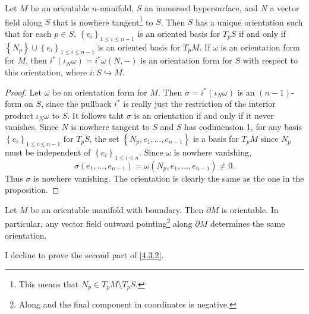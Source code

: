 \begin{proposition}\label{4.3.1}
	Let $M$ be an orientable $n$-manifold, $S$ an immersed hypersurface, and $N$ a vector field along $S$ that is nowhere tangent\footnote{This means that $N_p \in T_pM\setminus T_pS$.} to $S$. Then $S$ has a unique orientation such that for each $p\in S$, $\left\{ e_i \right\} _{1\leq i\leq n-1} $ is an oriented basis for $T_pS$ if and only if $\left\{ N_p \right\} \cup \left\{ e_i \right\} _{1\leq i\leq n-1} $ is an oriented basis for $T_pM$. If $\omega $ is an orientation form for $M$, then $i^*(\iota _N\omega )=i^*\omega (N,-)$ is an orientation form for $S$ with respect to this orientation, where $i : S \hookrightarrow M$.
\end{proposition}
\begin{proof}
	Let $\omega $ be an orientation form for $M$. Then $\sigma =i^*(\iota _N\omega )$ is an $(n-1)$-form on $S$, since the pullback $i^*$ is really just the restriction of the interior product $\iota _N\omega $ to $S$. It follows taht $\sigma $ is an orientation if and only if it never vanishes. Since $N$ is nowhere tangent to $S$ and $S$ has codimension 1, for any basis $\left\{ e_i \right\} _{1\leq i\leq n-1} $ for $T_pS$, the set $\left\{ N_p,e_1, \ldots ,e_{n-1}  \right\} $ is a basis for $T_pM$ since $N_p$ must be independent of $\left\{ e_i \right\} _{1\leq i\leq n} $. Since $\omega $ is nowhere vanishing,
	\[
		\sigma (e_1, \ldots ,e_{n-1} )=\omega (N_p, e_1, \ldots ,e_{n-1} )\neq 0
	.\]
	Thus $\sigma $ is nowhere vanishing. The orientation is clearly the same as the one in the proposition.
\end{proof}

\begin{corollary}\label{4.3.2}
	Let $M$ be an orientable manifold with boundary. Then $\partial M$ is orientable. In particular, any vector field outward pointing\footnote{Along and the final component in coordinates is negative.} along $\partial M$ determines the same orientation.
\end{corollary}

I decline to prove the second part of \cref{4.3.2}.
